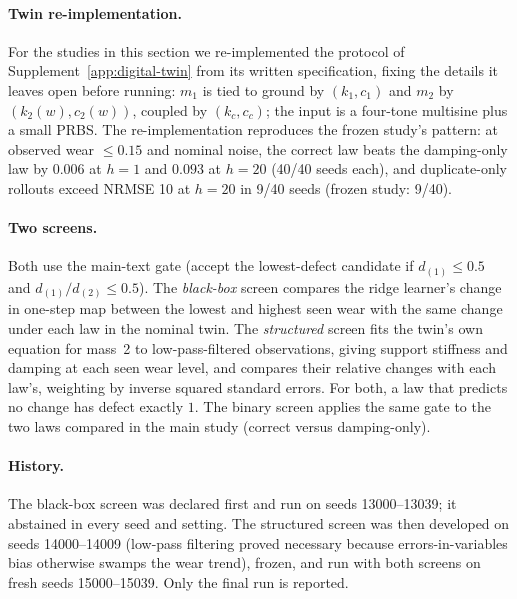 \paragraph{Twin re-implementation.} For the studies in this section we re-implemented the protocol of Supplement~\ref{app:digital-twin} from its written specification, fixing the details it leaves open before running: $m_1$ is tied to ground by $(k_1,c_1)$ and $m_2$ by $(k_2(w),c_2(w))$, coupled by $(k_c,c_c)$; the input is a four-tone multisine plus a small PRBS. The re-implementation reproduces the frozen study's pattern: at observed wear $\le0.15$ and nominal noise, the correct law beats the damping-only law by $0.006$ at $h=1$ and $0.093$ at $h=20$ (40/40 seeds each), and duplicate-only rollouts exceed NRMSE 10 at $h=20$ in 9/40 seeds (frozen study: 9/40).

\paragraph{Two screens.} Both use the main-text gate (accept the lowest-defect candidate if $d_{(1)}\le0.5$ and $d_{(1)}/d_{(2)}\le0.5$). The \emph{black-box} screen compares the ridge learner's change in one-step map between the lowest and highest seen wear with the same change under each law in the nominal twin. The \emph{structured} screen fits the twin's own equation for mass~2 to low-pass-filtered observations, giving support stiffness and damping at each seen wear level, and compares their relative changes with each law's, weighting by inverse squared standard errors. For both, a law that predicts no change has defect exactly $1$. The binary screen applies the same gate to the two laws compared in the main study (correct versus damping-only).

\paragraph{History.} The black-box screen was declared first and run on seeds 13000--13039; it abstained in every seed and setting. The structured screen was then developed on seeds 14000--14009 (low-pass filtering proved necessary because errors-in-variables bias otherwise swamps the wear trend), frozen, and run with both screens on fresh seeds 15000--15039. Only the final run is reported.

